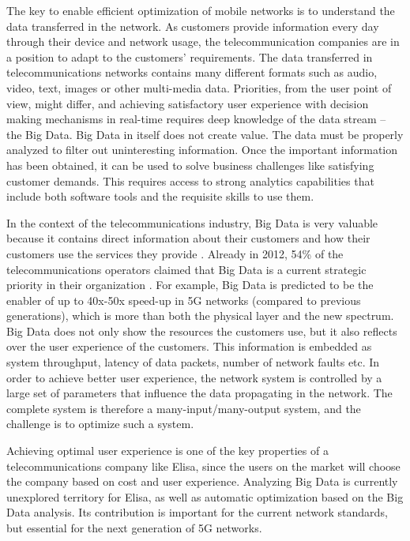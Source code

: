 \documentclass{article}
\begin{document}
The key to enable efficient optimization of mobile networks is to understand the data transferred in the network.
As customers provide information every day through their device and network usage, the telecommunication companies are in a position to adapt to the customers' requirements.
The data transferred in telecommunications networks contains many different formats such as audio, video, text, images or other multi-media data.
Priorities, from the user point of view, might differ, and achieving satisfactory user experience with decision making mechanisms in real-time requires deep knowledge of the data stream -- the Big Data.
Big Data in itself does not create value. 
The data must be properly analyzed to filter out uninteresting information.
Once the important information has been obtained, it can be used to solve business challenges like satisfying customer demands. 
This requires access to strong analytics capabilities \cite{Dam:13} that include both software tools and the requisite skills to use them.
\vspace{0.2cm}

In the context of the telecommunications industry, Big Data is very valuable because it contains direct information about their customers and how their customers use the services they provide \cite{Sipus:16}.
Already in 2012, 54\% of the telecommunications operators claimed that Big Data is a current strategic priority in their organization \cite{Jony:15}.
For example, Big Data is predicted to be the enabler of up to 40x-50x speed-up in 5G networks \cite{Imran:14} (compared to previous generations), which is more than both the physical layer and the new spectrum.
Big Data does not only show the resources the customers use, but it also reflects over the user experience of the customers.
This information is embedded as system throughput, latency of data packets, number of network faults etc.
In order to achieve better user experience, the network system is controlled by a large set of parameters that influence the data propagating in the network.
The complete system is therefore a many-input/many-output system, and the challenge is to optimize such a system.\vspace{0.2cm}

Achieving optimal user experience is one of the key properties of a telecommunications company like Elisa, since the users on the market will choose the company based on cost and user experience.
Analyzing Big Data is currently unexplored territory for Elisa, as well as automatic optimization based on the Big Data analysis.
Its contribution is important for the current network standards, but essential for the next generation of 5G networks.
\vspace{0.2cm}
\end{document}
